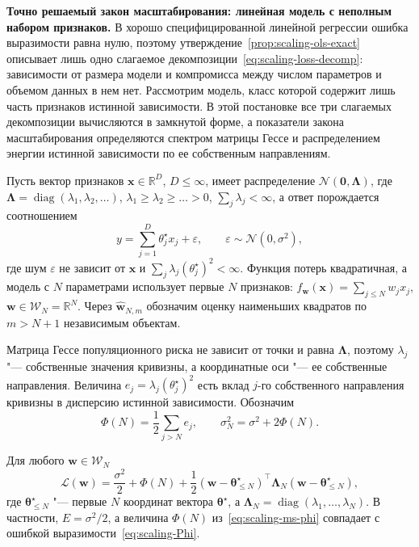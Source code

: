 \textbf{Точно решаемый закон масштабирования: линейная модель с неполным набором признаков.} В хорошо специфицированной линейной регрессии ошибка выразимости равна нулю, поэтому утверждение~\ref{prop:scaling-ols-exact} описывает лишь одно слагаемое декомпозиции~\eqref{eq:scaling-loss-decomp}: зависимости от размера модели и компромисса между числом параметров и объемом данных в нем нет. Рассмотрим модель, класс которой содержит лишь часть признаков истинной зависимости. В этой постановке все три слагаемых декомпозиции вычисляются в замкнутой форме, а показатели закона масштабирования определяются спектром матрицы Гессе и распределением энергии истинной зависимости по ее собственным направлениям.

Пусть вектор признаков $\mathbf x \in \mathbb R^{D}$, $D \leqslant \infty$, имеет распределение $\mathcal N(\mathbf 0, \boldsymbol\Lambda)$, где $\boldsymbol\Lambda = \operatorname{diag}(\lambda_1, \lambda_2, \dots)$, $\lambda_1 \geqslant \lambda_2 \geqslant \dots > 0$, $\sum_j \lambda_j < \infty$, а ответ порождается соотношением
\begin{equation}
    \label{eq:scaling-ms-model}
    y = \sum_{j=1}^{D} \theta_j^\star x_j + \varepsilon,
    \qquad
    \varepsilon \sim \mathcal N(0, \sigma^2),
\end{equation}
где шум $\varepsilon$ не зависит от $\mathbf x$ и $\sum_j \lambda_j (\theta_j^\star)^2 < \infty$. Функция потерь квадратичная, а модель с $N$ параметрами использует первые $N$ признаков: $f_{\mathbf w}(\mathbf x) = \sum_{j \leqslant N} w_j x_j$, $\mathbf w \in \mathcal W_N = \mathbb R^N$. Через $\hat{\mathbf w}_{N, m}$ обозначим оценку наименьших квадратов по $m > N + 1$ независимым объектам.

Матрица Гессе популяционного риска не зависит от точки и равна $\boldsymbol\Lambda$, поэтому $\lambda_j$ "--- собственные значения кривизны, а координатные оси "--- ее собственные направления. Величина $e_j = \lambda_j (\theta_j^\star)^2$ есть вклад $j$-го собственного направления кривизны в дисперсию истинной зависимости. Обозначим
\begin{equation}
    \label{eq:scaling-ms-phi}
    \Phi(N) = \frac12 \sum_{j > N} e_j,
    \qquad
    \sigma_N^2 = \sigma^2 + 2\Phi(N).
\end{equation}

\begin{lemma}
    \label{lem:scaling-ms-risk}
    Для любого $\mathbf w \in \mathcal W_N$
    \[
        \mathcal L(\mathbf w)
        = \frac{\sigma^2}{2} + \Phi(N) + \frac12 (\mathbf w - \boldsymbol\theta^\star_{\leqslant N})^\top \boldsymbol\Lambda_N (\mathbf w - \boldsymbol\theta^\star_{\leqslant N}),
    \]
    где $\boldsymbol\theta^\star_{\leqslant N}$ "--- первые $N$ координат вектора $\boldsymbol\theta^\star$, а $\boldsymbol\Lambda_N = \operatorname{diag}(\lambda_1, \dots, \lambda_N)$. В частности, $E = \sigma^2/2$, а величина $\Phi(N)$ из~\eqref{eq:scaling-ms-phi} совпадает с ошибкой выразимости~\eqref{eq:scaling-Phi}.
\end{lemma}

